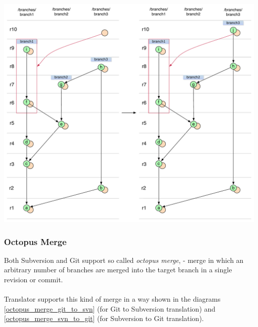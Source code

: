 \begin{center}
\includegraphics[width=\textwidth]{img/diagrams/no_merge_commit_cherry_pick_sequence_svn_to_git.pdf}%
\label{no_merge_commit_cherry_pick_sequence_svn_to_git}%
\end{center}

\subsubsection{Octopus Merge}

Both Subversion and Git support so called \emph{octopus merge}, - merge in which an arbitrary number of branches are merged into the target branch in a single revision or commit. 
\\\\
Translator supports this kind of merge in a way shown in the diagrams \ref{octopus_merge_git_to_svn} (for Git to Subversion translation) and \ref{octopus_merge_svn_to_git} (for Subversion to Git translation).

